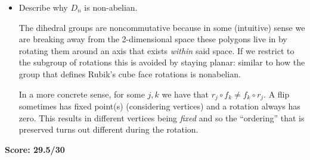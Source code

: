 \documentclass{article}
\begin{document}
\begin{enumerate}
\begin{itemize}
          \item Describe why $D_{n}$ is non-abelian.

                The dihedral groups are noncommutative because in some (intuitive) sense
                we are breaking away from the 2-dimensional space these polygons live in
                by rotating them around an axis that exists \emph{within} said space.
                If we restrict to the subgroup of rotations this is avoided by staying planar:
                similar to how the group that defines Rubik's cube face rotations is nonabelian.

                In a more concrete sense, for some $j, k$ we have that $r_{j} \circ f_{k} \ne f_{k} \circ r_{j}$.
                A flip sometimes has fixed point(s) (considering vertices) and a rotation always has zero.
                This results in different vertices being \emph{fixed} and so the ``ordering'' that
                is preserved turns out different during the rotation.
        \end{itemize}
\end{enumerate}

\textbf{Score: 29.5/30}
\end{document}

